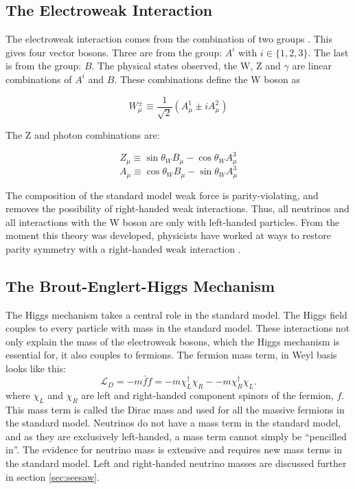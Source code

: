 \subsection{The Electroweak Interaction}
The electroweak interaction comes from the combination of two groups \SUtwoUone . This gives four vector bosons.  Three are from the \SUtwoL group: \ensuremath{A^i} with \ensuremath{i\in\{1,2,3\}}.  The last is from the \Uone group: \ensuremath{B}. The physical states observed, the W, Z and \ensuremath{\gamma} are linear combinations of \ensuremath{A^i} and \ensuremath{B}. These combinations define the W boson as

\begin{equation}\label{eq:Wboson}
    W_{\mu}^{\pm}
    \equiv  
    \frac{1}{\sqrt{2}}
    \left(
    A_{\mu}^{1}
    \pm
    iA_{\mu}^{2}
    \right)
\end{equation}

The Z and photon combinations are:

\begin{equation}\label{eq:Z}
    Z_{\mu}
    \equiv  
    \sin{\theta_W}
    B_{\mu}
    -
    \cos{\theta_W}
    A_\mu^3
    \end{equation}
\begin{equation}\label{eq:photon}
     A_{\mu}
    \equiv  
    \cos{\theta_W}
    B_{\mu}
    -
    \sin{\theta_W}
    A_\mu^3
\end{equation}

The \vminusa composition of the standard model weak force is parity-violating, and removes the possibility of right-handed weak interactions.  Thus, all neutrinos and all interactions with the W boson are only with left-handed particles. From the moment this theory was developed, physicists have worked at ways to restore parity symmetry with a right-handed weak interaction \cite{lr}\cite{lr1}.

\subsection{The Brout-Englert-Higgs Mechanism}
The Higgs mechanism takes a central role in the standard model. The Higgs field couples to every particle with mass in the standard model.  These interactions not only explain the mass of the electroweak bosons, which the Higgs mechanism is essential for, it also couples to fermions. The fermion mass term, in Weyl basis looks like this:
\begin{equation}\label{eq:higgs_fermion_mass}
\mathcal{L}_{D} = -m\bar{f}f = -m \chi _{L}^{\dagger}\chi _{R} - -m \chi _{R}^{\dagger}\chi _{L}.
\end{equation}
where $\chi _{L}$ and $\chi _{R}$ are left and right-handed component spinors of the fermion, $f$. This mass term is called the Dirac mass and used for all the massive fermions in the standard model. Neutrinos do not have a mass term in the standard model, and as they are exclusively left-handed, a mass term cannot simply be ``pencilled in''. The evidence for neutrino mass is extensive \cite{solar_neutrinos_davis}\cite{SNO_neutrinos} and requires new mass terms in the standard model. Left and right-handed neutrino masses are discussed further in section \ref{sec:seesaw}.
